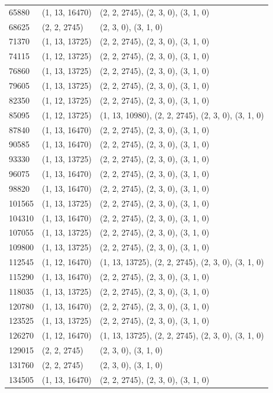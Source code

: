 \begin{center}
\begin{longtable}{|l|l|l|}
65880 & (1, 13, 16470) & (2, 2, 2745), (2, 3, 0), (3, 1, 0) \\
68625 & (2, 2, 2745) & (2, 3, 0), (3, 1, 0) \\
71370 & (1, 13, 13725) & (2, 2, 2745), (2, 3, 0), (3, 1, 0) \\
74115 & (1, 12, 13725) & (2, 2, 2745), (2, 3, 0), (3, 1, 0) \\
76860 & (1, 13, 13725) & (2, 2, 2745), (2, 3, 0), (3, 1, 0) \\
79605 & (1, 13, 13725) & (2, 2, 2745), (2, 3, 0), (3, 1, 0) \\
82350 & (1, 12, 13725) & (2, 2, 2745), (2, 3, 0), (3, 1, 0) \\
85095 & (1, 12, 13725) & (1, 13, 10980), (2, 2, 2745), (2, 3, 0), (3, 1, 0) \\
87840 & (1, 13, 16470) & (2, 2, 2745), (2, 3, 0), (3, 1, 0) \\
90585 & (1, 13, 16470) & (2, 2, 2745), (2, 3, 0), (3, 1, 0) \\
93330 & (1, 13, 13725) & (2, 2, 2745), (2, 3, 0), (3, 1, 0) \\
96075 & (1, 13, 16470) & (2, 2, 2745), (2, 3, 0), (3, 1, 0) \\
98820 & (1, 13, 16470) & (2, 2, 2745), (2, 3, 0), (3, 1, 0) \\
101565 & (1, 13, 13725) & (2, 2, 2745), (2, 3, 0), (3, 1, 0) \\
104310 & (1, 13, 16470) & (2, 2, 2745), (2, 3, 0), (3, 1, 0) \\
107055 & (1, 13, 13725) & (2, 2, 2745), (2, 3, 0), (3, 1, 0) \\
109800 & (1, 13, 13725) & (2, 2, 2745), (2, 3, 0), (3, 1, 0) \\
112545 & (1, 12, 16470) & (1, 13, 13725), (2, 2, 2745), (2, 3, 0), (3, 1, 0) \\
115290 & (1, 13, 16470) & (2, 2, 2745), (2, 3, 0), (3, 1, 0) \\
118035 & (1, 13, 13725) & (2, 2, 2745), (2, 3, 0), (3, 1, 0) \\
120780 & (1, 13, 16470) & (2, 2, 2745), (2, 3, 0), (3, 1, 0) \\
123525 & (1, 13, 13725) & (2, 2, 2745), (2, 3, 0), (3, 1, 0) \\
126270 & (1, 12, 16470) & (1, 13, 13725), (2, 2, 2745), (2, 3, 0), (3, 1, 0) \\
129015 & (2, 2, 2745) & (2, 3, 0), (3, 1, 0) \\
131760 & (2, 2, 2745) & (2, 3, 0), (3, 1, 0) \\
134505 & (1, 13, 16470) & (2, 2, 2745), (2, 3, 0), (3, 1, 0) \\

\end{longtable}
\end{center}
